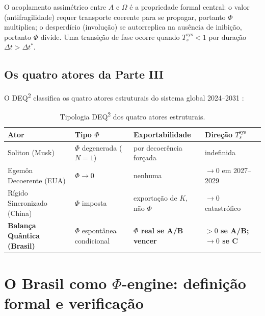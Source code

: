 \documentclass[12pt]{article}
\theoremstyle{definition}
\theoremstyle{remark}
\begin{document}
O acoplamento assim\'{e}trico entre \(A\) e \(\Omega\) \'{e} a propriedade formal central: o valor (antifragilidade) requer transporte coerente para se propagar, portanto \(\Phi\) multiplica; o desperd\'{i}cio (involução) se autorreplica na aus\^{e}ncia de inibi\c{c}\~{a}o, portanto \(\Phi\) divide. Uma transi\c{c}\~{a}o de fase ocorre quando \(T_s^{\text{sys}} < 1\) por dura\c{c}\~{a}o \(\Delta t > \Delta t^*\).

\subsection{Os quatro atores da Parte III}

O DEQ\textsuperscript{2} classifica os quatro atores estruturais do sistema global 2024--2031 \citep{marcelino2026c}:

\begin{table}[h]
\centering
\caption{Tipologia DEQ\textsuperscript{2} dos quatro atores estruturais.}
\label{tab:atores}
{\small\begin{tabular}{llll}
\toprule
Ator & Tipo \(\Phi\) & Exportabilidade & Dire\c{c}\~{a}o \(T_s^{\text{sys}}\) \\
\midrule
Soliton (Musk) & \(\Phi\) degenerada (\(N=1\)) & por decoer\^{e}ncia for\c{c}ada & indefinida \\
Egem\^{o}n Decoerente (EUA) & \(\Phi \to 0\) & nenhuma & \(\to 0\) em 2027--2029 \\
R\'{i}gido Sincronizado (China) & \(\Phi\) imposta & exporta\c{c}\~{a}o de \(K\), n\~{a}o \(\Phi\) & \(\to 0\) catastr\'{o}fico \\
\textbf{Balan\c{c}a Qu\^{a}ntica (Brasil)} & \(\Phi\) espont\^{a}nea condicional & \textbf{\(\Phi\) real se A/B vencer} & \textbf{\(> 0\) se A/B; \(\to 0\) se C} \\
\bottomrule
\end{tabular}}
\end{table}

\section{O Brasil como \(\Phi\)-engine: defini\c{c}\~{a}o formal e verifica\c{c}\~{a}o}
\end{document}
